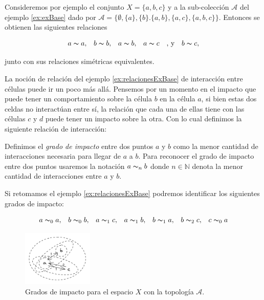 \begin{example}\label{ex:relacionesExBase}
Consideremos por ejemplo el conjunto $X=\{a,b,c\}$ y a la sub-colección $\mathcal{A}$ del ejemplo \ref{ex:exBase} dado por $\mathcal{A}=\{\emptyset,\{a\},\{b\}.\{a,b\},\{a,c\},\{a,b,c\}\}$. Entonces se obtienen las siguientes relaciones

$$\begin{array}{cccccc}
    a\thicksim a, & b\thicksim b, & a\thicksim b, & a\thicksim c & \text{, y} & b\thicksim c,
\end{array}$$

junto con sus relaciones simétricas equivalentes.
\end{example}

La noción de relación del ejemplo \ref{ex:relacionesExBase} de interacción entre células puede ir un poco más allá. Pensemos por un momento en el impacto que puede tener un comportamiento sobre la célula $b$ en la célula $a$, si bien estas dos celdas no interactúan entre sí, la relación que cada una de ellas tiene con las células $c$ y $d$ puede tener un impacto sobre la otra. Con lo cual definimos la siguiente relación de interacción:

\begin{definition}\label{def:gradoDeImpacto}
Definimos el \textit{grado de impacto} entre dos puntos $a$ y $b$ como la menor cantidad de interacciones necesaria para llegar de $a$ a $b$. Para reconocer el grado de impacto entre dos puntos usaremos la notación $a\thicksim_n b$ donde $n\in\mathbb{N}$ denota la menor cantidad de interacciones entre $a$ y $b$.
\end{definition}

Si retomamos el ejemplo \ref{ex:relacionesExBase} podremos identificar los siguientes grados de impacto:

$$\begin{array}{ccccccc}
    a\thicksim_0 a, & b\thicksim_0 b, & a\thicksim_1 c, & a\thicksim_1 b, &
    b\thicksim_1 a, & b\thicksim_2 c, & c\thicksim_0 a
\end{array}$$
\begin{figure}[h]\label{fig:gradoImpacto}
  \centering
    \includegraphics[width=0.3\textwidth]{Imagenes/grados_de_impacto.PNG}
  \caption{Grados de impacto para el espacio $X$ con la topología $\mathcal{A}$.}
\end{figure}

